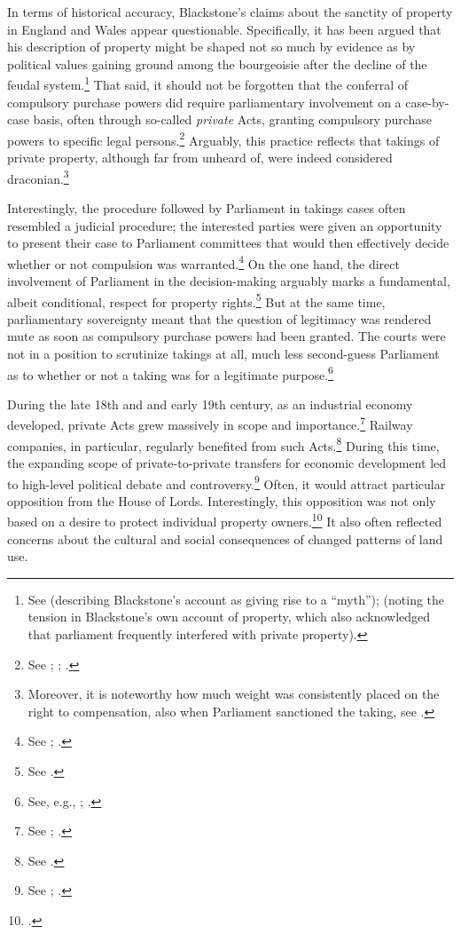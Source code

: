 In terms of historical accuracy, Blackstone's claims about the sanctity of property in England and Wales appear questionable. Specifically, it has been argued that his description of property might be shaped not so much by evidence as by political values gaining ground among the bourgeoisie after the decline of the feudal system.\footnote{See \cite[34-35]{waring09} (describing Blackstone's account as giving rise to a ``myth''); \cite[121]{hoppit11} (noting the tension in Blackstone's own account of property, which also acknowledged that parliament frequently interfered with private property).} That said, it should not be forgotten that the conferral of compulsory purchase powers did require parliamentary involvement on a case-by-case basis, often through so-called {\it private} Acts, granting compulsory purchase powers to specific legal persons.\footnote{See \cite[43-46]{nulty12}; \cite[204]{allen00}; \cite[104-116]{waring09}.} Arguably, this practice reflects that takings of private property, although far from unheard of, were indeed considered draconian.\footnote{Moreover, it is noteworthy how much weight was consistently placed on the right to compensation, also when Parliament sanctioned the taking, see \cite[15]{allen00}.}

Interestingly, the procedure followed by Parliament in takings cases often resembled a judicial procedure; the interested parties were given an opportunity to present their case to Parliament committees that would then effectively decide whether or not compulsion was warranted.\footnote{See \cite[13-16]{allen00}; \cite[105-106]{waring09}.} On the one hand, the direct involvement of Parliament in the decision-making arguably marks a fundamental, albeit conditional, respect for property rights.\footnote{See \cite[103]{hoppit11}.} But at the same time, parliamentary sovereignty meant that the question of legitimacy was rendered mute as soon as compulsory purchase powers had been granted. The courts were not in a position to scrutinize takings at all, much less second-guess Parliament as to whether or not a taking was for a legitimate purpose.\footnote{See, e.g., \cite[643]{nulty12}; \cite[107]{waring09}.}

During the late 18th and and early 19th century, as an industrial economy developed, private Acts grew massively in scope and importance.\footnote{See \cite[108-112]{waring09}; \cite[100-101]{hoppit11}.} Railway companies, in particular, regularly benefited from such Acts.\footnote{See \cite[144]{kostal97}.} During this time, the expanding scope of private-to-private transfers for economic development led to high-level political debate and controversy.\footnote{See \cite[144]{kostal97}; \cite[204]{allen00}.} Often, it would attract particular opposition from the House of Lords. Interestingly, this opposition was not only based on a desire to protect individual property owners.\footcite[204-205]{allen00} It also often reflected concerns about the cultural and social consequences of changed patterns of land use.

